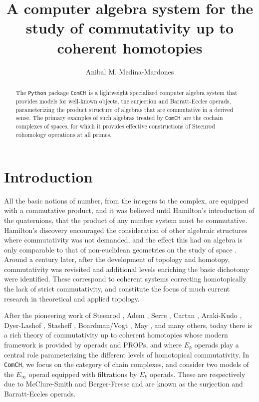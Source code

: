 \documentclass{amsart}
\title[A C.A.S. for the study of commutativity up to coherent homotopies]{A computer algebra system for the study of commutativity up to coherent homotopies}
\author{Anibal M. Medina-Mardones}
\newcommand{\comch}{\texttt{ComCH}}
\begin{document}
\begin{abstract}
	The \texttt{Python} package \comch\, is a lightweight specialized computer algebra system that provides models for well-known objects, the surjection and Barratt-Eccles operads, parameterizing the product structure of algebras that are commutative in a derived sense.
	The primary examples of such algebras treated by \comch\, are the cochain complexes of spaces, for which it provides effective constructions of Steenrod cohomology operations at all primes.
\end{abstract}

\maketitle

\section{Introduction}

All the basic notions of number, from the integers to the complex, are equipped with a commutative product, and it was believed until Hamilton's introduction of the quaternions, that the product of any number system must be commutative.
Hamilton's discovery encouraged the consideration of other algebraic structures where commutativity was not demanded, and the effect this had on algebra is only comparable to that of non-euclidean geometries on the study of space \cite[Ch.V]{Kline1982}.
Around a century later, after the development of topology and homotopy, commutativity was revisited and additional levels enriching the basic dichotomy were identified.
These correspond to coherent systems correcting homotopically the lack of strict commutativity, and constitute the focus of much current research in theoretical and applied topology.

After the pioneering work of Steenrod \cite{Steenrod47, Steenrod62}, Adem \cite{Adem52}, Serre \cite{Serre53}, Cartan \cite{Cartan55}, Araki-Kudo \cite{ArakiKudo56}, Dyer-Lashof \cite{DyerLashof62}, Stasheff \cite{Stasheff63}, Boardman\-/Vogt \cite{BoardmanVogt73}, May \cite{May70algebraic, May72geometry}, and many others, today there is a rich theory of commutativity up to coherent homotopies whose modern framework is provided by operads and PROPs, and where $E_k$ operads play a central role parameterizing the different levels of homotopical commutativity.
In \comch, we focus on the category of chain complexes, and consider two models of the $E_\infty$ operad equipped with filtrations by $E_k$ operads.
These are respectively due to McClure-Smith \cite{McClureSmith03} and Berger-Fresse \cite{BergerFresse04} and are known as the surjection and Barratt-Eccles operads.
\end{document}
